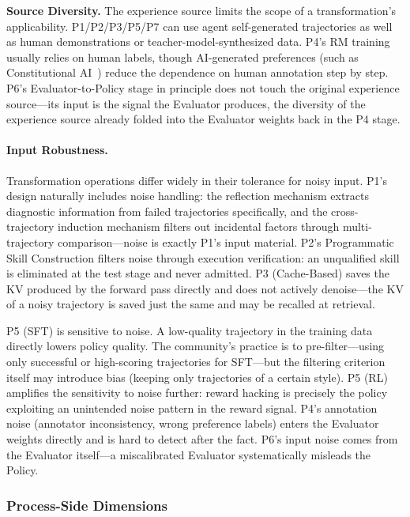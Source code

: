\textbf{Source Diversity.} The experience source limits the scope of a transformation's applicability. P1/P2/P3/P5/P7 can use agent self-generated trajectories as well as human demonstrations or teacher-model-synthesized data. P4's RM training usually relies on human labels, though AI-generated preferences (such as Constitutional AI~\cite{Bai22b}) reduce the dependence on human annotation step by step. P6's Evaluator-to-Policy stage in principle does not touch the original experience source---its input is the signal the Evaluator produces, the diversity of the experience source already folded into the Evaluator weights back in the P4 stage.

\paragraph{Input Robustness.} Transformation operations differ widely in their tolerance for noisy input. P1's design naturally includes noise handling: the reflection mechanism extracts diagnostic information from failed trajectories specifically, and the cross-trajectory induction mechanism filters out incidental factors through multi-trajectory comparison---noise is exactly P1's input material. P2's Programmatic Skill Construction filters noise through execution verification: an unqualified skill is eliminated at the test stage and never admitted. P3 (Cache-Based) saves the KV produced by the forward pass directly and does not actively denoise---the KV of a noisy trajectory is saved just the same and may be recalled at retrieval.

P5 (SFT) is sensitive to noise. A low-quality trajectory in the training data directly lowers policy quality. The community's practice is to pre-filter---using only successful or high-scoring trajectories for SFT---but the filtering criterion itself may introduce bias (keeping only trajectories of a certain style). P5 (RL) amplifies the sensitivity to noise further: reward hacking is precisely the policy exploiting an unintended noise pattern in the reward signal. P4's annotation noise (annotator inconsistency, wrong preference labels) enters the Evaluator weights directly and is hard to detect after the fact. P6's input noise comes from the Evaluator itself---a miscalibrated Evaluator systematically misleads the Policy.

\subsubsection{Process-Side Dimensions}


